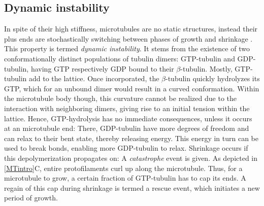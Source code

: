 \subsection{Dynamic instability}
\label{sec:instability}
In spite of their high stiffness, microtubules are no static structures, instead their plus ends are stochastically switching between phases of growth and shrinkage \parencite{Janosi2002}. This property is termed \textit{dynamic instability}. It stems from the existence of two conformationally distinct populations of tubulin dimers: GTP-tubulin and GDP-tubulin, having GTP respectively GDP bound to their $\beta$-tubulin. Mostly, GTP-tubulin add to the lattice. Once incorporated, the $\beta$-tubulin quickly hydrolyzes its GTP, which for an unbound dimer would result in a curved conformation. Within the microtubule body though, this curvature cannot be realized due to the interaction with neighboring dimers, giving rise to an initial tension within the lattice. Hence, GTP-hydrolysis has no immediate consequences, unless it occurs at an microtubule end: There, GDP-tubulin have more degrees of freedom and can relax to their bent state, thereby releasing energy. This energy in turn can be used to break bonds, enabling more GDP-tubulin to relax. Shrinkage occurs if this depolymerization propagates on: A \textit{catastrophe} event is given. As depicted in \autoref{MTintro}C, entire protofilaments curl up along the microtubule. Thus, for a microtubule to grow, a certain fraction of GTP-tubulin has to cap its ends. A regain of this cap during shrinkage is termed a rescue event, which initiates a new period of growth.

